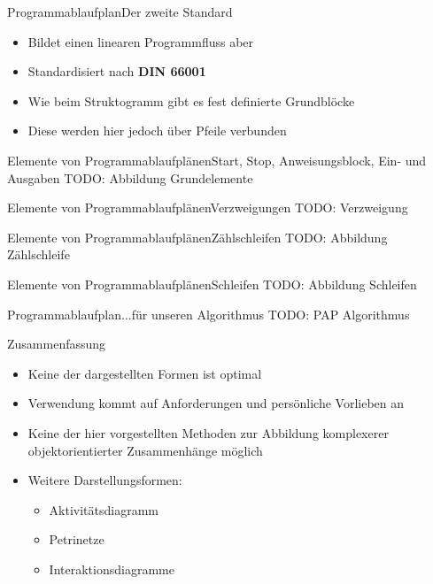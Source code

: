 \begin{frame}{Programmablaufplan}{Der zweite Standard}
    \begin{itemize}
        \item Bildet einen linearen Programmfluss aber
        \item Standardisiert nach \textbf{DIN 66001}
        \item Wie beim Struktogramm gibt es fest definierte Grundblöcke
        \item Diese werden hier jedoch über Pfeile verbunden
    \end{itemize}
\end{frame}

\begin{frame}{Elemente von Programmablaufplänen}{Start, Stop, Anweisungsblock, Ein- und Ausgaben}
TODO: Abbildung Grundelemente
\end{frame}

\begin{frame}{Elemente von Programmablaufplänen}{Verzweigungen}
TODO: Verzweigung
\end{frame}

\begin{frame}{Elemente von Programmablaufplänen}{Zählschleifen}
TODO: Abbildung Zählschleife
\end{frame}

\begin{frame}{Elemente von Programmablaufplänen}{Schleifen}
TODO: Abbildung Schleifen
\end{frame}

\begin{frame}{Programmablaufplan}{...für unseren Algorithmus}
TODO: PAP Algorithmus
\end{frame}

\begin{frame}{Zusammenfassung}
    \begin{itemize}[<+->]
        \item Keine der dargestellten Formen ist optimal
        \item Verwendung kommt auf Anforderungen und persönliche Vorlieben an
        \item Keine der hier vorgestellten Methoden zur Abbildung komplexerer objektorientierter Zusammenhänge möglich
        \item Weitere Darstellungsformen:
        \begin{itemize}
            \item Aktivitätsdiagramm
            \item Petrinetze
            \item Interaktionsdiagramme
        \end{itemize}
    \end{itemize}
\end{frame}